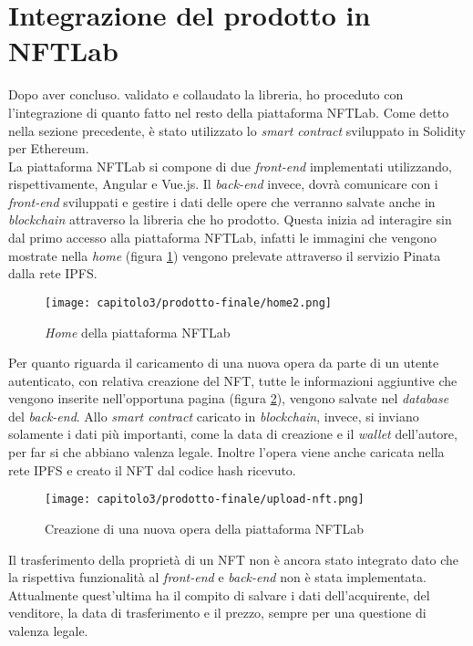 
\section{Integrazione del prodotto in NFTLab}
Dopo aver concluso. validato e collaudato la libreria, ho proceduto con l'integrazione di quanto fatto nel resto della piattaforma NFTLab. Come detto nella sezione precedente, è stato utilizzato lo \textit{smart contract} sviluppato in Solidity per Ethereum. \\

La piattaforma NFTLab si compone di due \textit{front-end} implementati utilizzando, rispettivamente, Angular e Vue.js. Il \textit{back-end} invece, dovrà comunicare con i \textit{front-end} sviluppati e gestire i dati delle opere che verranno salvate anche in \textit{blockchain} attraverso la libreria che ho prodotto. Questa inizia ad interagire sin dal primo accesso alla piattaforma NFTLab, infatti le immagini che vengono mostrate nella \textit{home} (figura \ref{nftlab:home}) vengono prelevate attraverso il servizio Pinata dalla rete IPFS.

\clearpage
\begin{figure}[h!]
  \centering
  \texttt{[image: capitolo3/prodotto-finale/home2.png]}
  \caption{\textit{Home} della piattaforma NFTLab}
  \label{nftlab:home}
\end{figure}

Per quanto riguarda il caricamento di una nuova opera da parte di un utente autenticato, con relativa creazione del NFT, tutte le informazioni aggiuntive che vengono inserite nell'opportuna pagina (figura \ref{nftlab:upload-new-nft}), vengono salvate nel \textit{database} del \textit{back-end}. Allo \textit{smart contract} caricato in \textit{blockchain}, invece, si inviano solamente i dati più importanti, come la data di creazione e il \textit{wallet} dell'autore, per far si che abbiano valenza legale. Inoltre l'opera viene anche caricata nella rete IPFS e creato il NFT dal codice hash ricevuto.

\begin{figure}[h!]
  \centering
  \texttt{[image: capitolo3/prodotto-finale/upload-nft.png]}
  \caption{Creazione di una nuova opera della piattaforma NFTLab}
  \label{nftlab:upload-new-nft}
\end{figure}

Il trasferimento della proprietà di un NFT non è ancora stato integrato dato che la rispettiva funzionalità al \textit{front-end} e \textit{back-end} non è stata implementata. Attualmente quest'ultima ha il compito di salvare i dati dell'acquirente, del venditore, la data di trasferimento e il prezzo, sempre per una questione di valenza legale.
